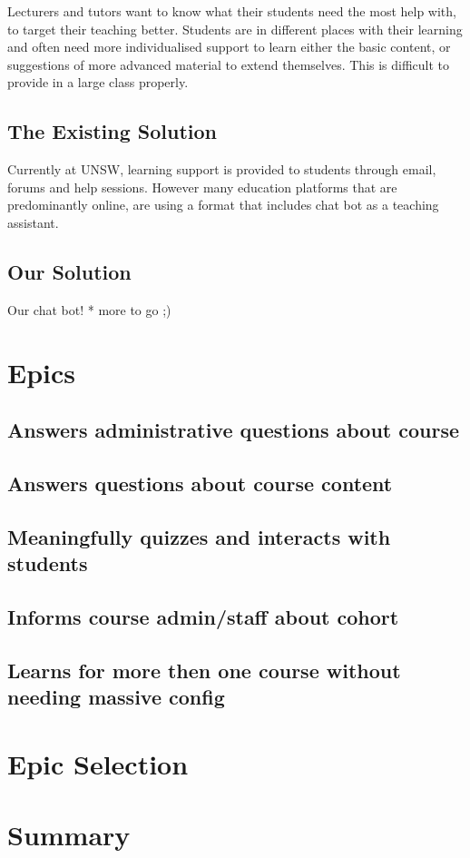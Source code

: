 \documentclass{article}
\begin{document}
Lecturers and tutors want to know what their students need the most help with, to target their teaching better. Students are in different 
places with their learning and often need more individualised support to learn either the basic content, or suggestions of more advanced 
material to extend themselves. This is difficult to provide in a large class properly.

\subsection{The Existing Solution}
Currently at UNSW, learning support is provided to students through email, forums and help sessions. However many education
platforms that are predominantly online, are using a format that includes chat bot as a teaching assistant.

\subsection{Our Solution}
Our chat bot! * more to go ;) 

\section{Epics}
\subsection{Answers administrative questions about course}


\subsection{Answers questions about course content}


\subsection{Meaningfully quizzes and interacts with students}


\subsection{Informs course admin/staff about cohort}


\subsection{Learns for more then one course without needing massive config}


\section{Epic Selection}

\section{Summary}
\end{document}
